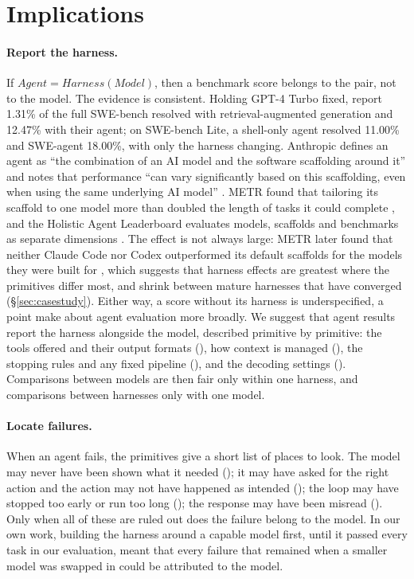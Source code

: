 \section{Implications}
\label{sec:implications}

\paragraph{Report the harness.} If $\textit{Agent} = \textit{Harness}(\textit{Model})$, then a benchmark score belongs to the pair, not to the model. The evidence is consistent. Holding GPT-4 Turbo fixed, \citet{yang2024sweagent} report 1.31\% of the full SWE-bench \citep{jimenez2024swebench} resolved with retrieval-augmented generation and 12.47\% with their agent; on SWE-bench Lite, a shell-only agent resolved 11.00\% and SWE-agent 18.00\%, with only the harness changing. Anthropic defines an agent as ``the combination of an AI model and the software scaffolding around it'' and notes that performance ``can vary significantly based on this scaffolding, even when using the same underlying AI model'' \citep{anthropic2025swebench}. METR found that tailoring its scaffold to one model more than doubled the length of tasks it could complete \citep{metr2025update}, and the Holistic Agent Leaderboard evaluates models, scaffolds and benchmarks as separate dimensions \citep{kapoor2025hal}. The effect is not always large: METR later found that neither Claude Code nor Codex outperformed its default scaffolds for the models they were built for \citep{metr2026harness}, which suggests that harness effects are greatest where the primitives differ most, and shrink between mature harnesses that have converged (\S\ref{sec:casestudy}). Either way, a score without its harness is underspecified, a point \citet{kapoor2024agents} make about agent evaluation more broadly.
We suggest that agent results report the harness alongside the model, described primitive by primitive: the tools offered and their output formats (), how context is managed (), the stopping rules and any fixed pipeline (), and the decoding settings (). Comparisons between models are then fair only within one harness, and comparisons between harnesses only with one model.

\paragraph{Locate failures.} When an agent fails, the primitives give a short list of places to look. The model may never have been shown what it needed (); it may have asked for the right action and the action may not have happened as intended (); the loop may have stopped too early or run too long (); the response may have been misread (). Only when all of these are ruled out does the failure belong to the model. In our own work, building the harness around a capable model first, until it passed every task in our evaluation, meant that every failure that remained when a smaller model was swapped in could be attributed to the model.

